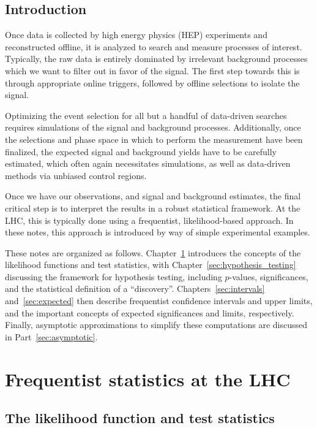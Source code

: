 \chapter{Introduction}

Once data is collected by high energy physics (HEP) experiments and reconstructed offline, it is analyzed to search and measure processes of interest.
Typically, the raw data is entirely dominated by irrelevant background processes which we want to filter out in favor of the signal.
The first step towards this is through appropriate online triggers, followed by offline selections to isolate the signal.

Optimizing the event selection for all but a handful of data-driven searches requires simulations of the signal and background processes.
Additionally, once the selections and phase space in which to perform the measurement have been finalized, the expected signal and background yields have to be carefully estimated, which often again necessitates simulations, as well as data-driven methods via unbiased control regions.

Once we have our observations, and signal and background estimates, the final critical step is to interpret the results in a robust statistical framework.
At the LHC, this is typically done using a frequentist, likelihood-based approach.
In these notes, this approach is introduced by way of simple experimental examples.

These notes are organized as follows.
Chapter~\ref{sec:likelihood} introduces the concepts of the likelihood functions and test statistics, with Chapter~\ref{sec:hypothesis_testing} discussing the framework for hypothesis testing, including $p$-values, significances, and the statistical definition of a ``discovery''.
Chapters~\ref{sec:intervals} and~\ref{sec:expected} then describe frequentist confidence intervals and upper limits, and the important concepts of expected significances and limits, respectively.
Finally, asymptotic approximations to simplify these computations are discussed in Part~\ref{sec:asymptotic}.


\part{Frequentist statistics at the LHC}

\chapter{The likelihood function and test statistics}
\label{sec:likelihood}

